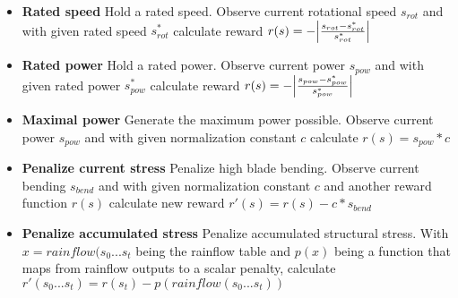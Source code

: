 \documentclass[hyperref,german,beleg]{cgvpub}
\begin{document}
\begin{itemize}

\item \textbf{Rated speed} Hold a rated speed. Observe current rotational speed \(s_{rot}\) and with given rated speed \(s^*_{rot}\) calculate reward \(r(s) = -\abs{\frac{s_{rot} - s^*_{rot}}{s^*_{rot}}}\)

\item \textbf{Rated power} Hold a rated power. Observe current power \(s_{pow}\) and with given rated power \(s^*_{pow}\) calculate reward \(r(s) = -\abs{\frac{s_{pow} - s^*_{pow}}{s^*_{pow}}}\)

\item \textbf{Maximal power} Generate the maximum power possible. Observe current power \(s_{pow}\) and with given normalization constant \(c\) calculate \(r(s) = s_{pow} * c\)

\item \textbf{Penalize current stress} Penalize high blade bending. Observe current bending \(s_{bend}\) and with given normalization constant \(c\) and another reward function \(r(s)\) calculate new reward \(r'(s) = r(s) - c * s_{bend} \)

\item \textbf{Penalize accumulated stress} Penalize accumulated structural stress. With \(x = rainflow(s_0...s_t\) being the rainflow table and \(p(x)\) being a function that maps from rainflow outputs to a scalar penalty, calculate \(r'(s_0...s_t) = r(s_t) - p(rainflow(s_0...s_t))\)

\end{itemize}
\end{document}
